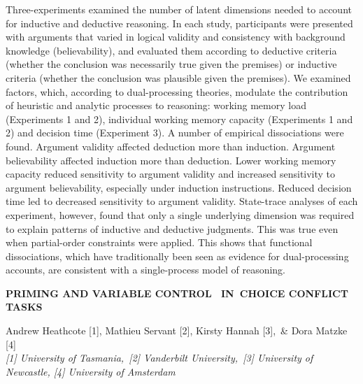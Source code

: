 \documentclass[]{article}
\begin{document}
Three-experiments examined the number of latent dimensions needed to
account for inductive and deductive reasoning. In each study,
participants were presented with arguments that varied in logical
validity and consistency with background knowledge (believability), and
evaluated them according to deductive criteria (whether the conclusion
was necessarily true given the premises) or inductive criteria (whether
the conclusion was plausible given the premises). We examined factors,
which, according to dual-processing theories, modulate the contribution
of heuristic and analytic processes to reasoning: working memory load
(Experiments 1 and 2), individual working memory capacity (Experiments 1
and 2) and decision time (Experiment 3). A number of empirical
dissociations were found. Argument validity affected deduction more than
induction. Argument believability affected induction more than
deduction. Lower working memory capacity reduced sensitivity to argument
validity and increased sensitivity to argument believability, especially
under induction instructions. Reduced decision time led to decreased
sensitivity to argument validity. State-trace analyses of each
experiment, however, found that only a single underlying dimension was
required to explain patterns of inductive and deductive judgments. This
was true even when partial-order constraints were applied. This shows
that functional dissociations, which have traditionally been seen as
evidence for dual-processing accounts, are consistent with a
single-process model of reasoning.\\
\pagebreak  

\textbf{PRIMING AND VARIABLE CONTROL~ IN~CHOICE CONFLICT TASKS}

Andrew Heathcote {[}1{]}, Mathieu Servant {[}2{]}, Kirsty Hannah
{[}3{]},~\& Dora Matzke {[}4{]}\\
\emph{{[}1{]} University of Tasmania,~{[}2{]} Vanderbilt
University,~{[}3{]} University of Newcastle, {[}4{]} University of
Amsterdam}
\end{document}
